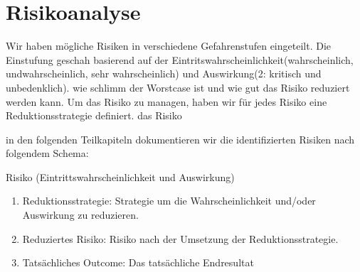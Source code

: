 \chapter{Risikoanalyse}
Wir haben mögliche Risiken in verschiedene Gefahrenstufen eingeteilt.
Die Einstufung geschah basierend auf der Eintritswahrscheinlichkeit(wahrscheinlich, undwahrscheinlich, sehr wahrscheinlich) und Auswirkung(2: kritisch und unbedenklich). wie schlimm der Worstcase ist und wie gut das Risiko reduziert werden kann.
Um das Risiko zu managen, haben wir für jedes Risiko eine Reduktionsstrategie definiert. 
das Risiko 


in den folgenden Teilkapiteln dokumentieren wir die identifizierten Risiken nach folgendem Schema:


Risiko (Eintrittswahrscheinlichkeit und Auswirkung)
\begin{enumerate}
    \item Reduktionsstrategie: Strategie um die Wahrscheinlichkeit und/oder Auswirkung zu reduzieren.
    \item Reduziertes Risiko: Risiko nach der Umsetzung der Reduktionsstrategie.
    \item Tatsächliches Outcome: Das tatsächliche Endresultat
\end{enumerate}


